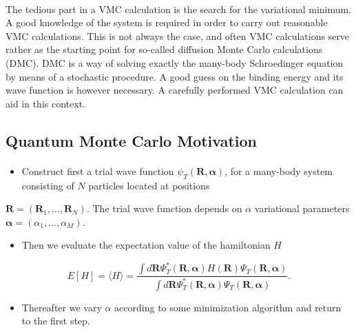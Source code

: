 \documentclass[%
twoside,                 %
final,                   %
10pt]{article}
\begin{document}
\paragraph{}
The tedious part in a VMC calculation is the search for the variational
minimum. A good knowledge of the system is required in order to carry out
reasonable VMC calculations. This is not always the case, 
and often VMC calculations 
serve rather as the starting
point for so-called diffusion Monte Carlo calculations (DMC). DMC is a way of
solving exactly the many-body Schroedinger equation by means of 
a stochastic procedure. A good guess on the binding energy
and its wave function is however necessary. 
A carefully performed VMC calculation can aid in this context.




\subsection{Quantum Monte Carlo Motivation}

\paragraph{}
\begin{itemize}
\item Construct first a trial wave function $\psi_T(\bm{R},\bm{\alpha})$,  for a many-body system consisting of $N$ particles located at positions 
\end{itemize}

\noindent
$\bm{R}=(\bm{R}_1,\dots ,\bm{R}_N)$. The trial wave function depends on $\alpha$ variational parameters $\bm{\alpha}=(\alpha_1,\dots ,\alpha_M)$.
\begin{itemize}
\item Then we evaluate the expectation value of the hamiltonian $H$ 
\end{itemize}

\noindent
\[
   E[H]=\langle H \rangle =
   \frac{\int d\bm{R}\Psi^{\ast}_{T}(\bm{R},\bm{\alpha})H(\bm{R})\Psi_{T}(\bm{R},\bm{\alpha})}
        {\int d\bm{R}\Psi^{\ast}_{T}(\bm{R},\bm{\alpha})\Psi_{T}(\bm{R},\bm{\alpha})}.
\]
\begin{itemize}
\item Thereafter we vary $\alpha$ according to some minimization algorithm and return to the first step.
\end{itemize}
\end{document}
